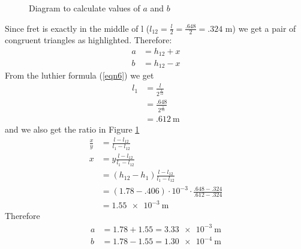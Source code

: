 \documentclass[11pt]{article}
\begin{document}
\begin{flushleft}
\begin{itemize}
\begin{figure}[ht]
                    \caption{Diagram to calculate values of $a$ and $b$} \label{fig4}
                \end{figure}
                Since fret  is exactly in the middle of l ($l_{12} = \frac{l}{2} = \frac{.648}{2} = .324$ m) we get a pair of congruent triangles as highlighted. Therefore:
                \begin{align*}
                    a &= h_{12} + x \\
                    b &= h_{12} - x
                \end{align*}
                From the luthier formula (\ref{eqn6}) we get
                \begin{align*}
                    l_1 &= \frac{l}{2^{\frac{1}{12}}} \\
                        &= \frac{.648}{2^{\frac{1}{12}}} \\
                        &= \SI{.612}{\meter}
                \end{align*}
                and we also get the ratio in Figure \ref{fig4}
                \begin{align*}
                    \frac{x}{y} &= \frac{l-l_{12}}{l_1-l_{12}} \\
                    x &= y\frac{l-l_{12}}{l_1-l_{12}} \\
                    &= (h_{12}-h_1)\frac{l-l_{12}}{l_1-l_{12}} \\
                    &= (1.78-.406) \cdot 10^{-3} \cdot \frac{.648-.324}{.612-.324} \\
                    &= \SI{1.55e-3}{\meter}
                \end{align*}
                Therefore
                \begin{align*}
                    a &= 1.78 + 1.55 = \SI{3.33e-3}{\meter} \\
                    b &= 1.78 - 1.55 = \SI{1.30e-4}{\meter}
                \end{align*}
                

                
            \end{itemize}
            
        
        
    \end{flushleft}
\end{document}
